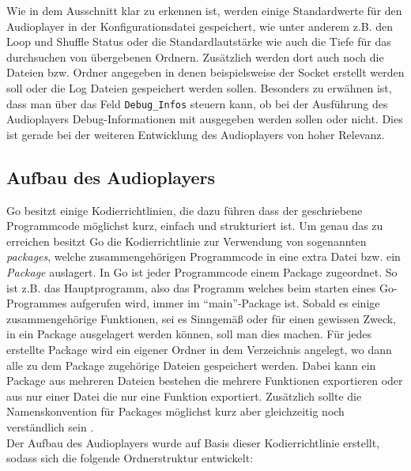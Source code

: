 Wie in dem Ausschnitt klar zu erkennen ist, werden einige Standardwerte für den
Audioplayer in der Konfigurationsdatei gespeichert, wie unter anderem z.B. den
Loop und Shuffle Status oder die Standardlautstärke wie auch die Tiefe für das
durchsuchen von übergebenen Ordnern. Zusätzlich werden dort auch noch die
Dateien bzw. Ordner angegeben in denen beispielsweise der Socket erstellt
werden soll oder die Log Dateien gespeichert werden sollen. Besonders zu
erwähnen ist, dass man über das Feld \verb|Debug_Infos| steuern kann, ob bei
der Ausführung des Audioplayers Debug-Informationen mit ausgegeben werden
sollen oder nicht. Dies ist gerade bei der weiteren Entwicklung des
Audioplayers von hoher Relevanz.

\subsection{Aufbau des Audioplayers}
Go besitzt einige Kodierrichtlinien, die dazu führen dass der geschriebene
Programmcode möglichst kurz, einfach und strukturiert ist. Um genau das zu
erreichen besitzt Go die Kodierrichtlinie zur Verwendung von sogenannten
\textit{packages}, welche zusammengehörigen Programmcode in eine extra Datei
bzw. ein \textit{Package} auslagert. In Go ist jeder Programmcode einem Package
zugeordnet. So ist z.B. das Hauptprogramm, also das Programm welches beim
starten eines Go-Programmes aufgerufen wird, immer im \enquote{main}-Package
ist. Sobald es einige zusammengehörige Funktionen, sei es Sinngemäß oder für
einen gewissen Zweck, in ein Package ausgelagert werden können, soll man dies
machen. Für jedes erstellte Package wird ein eigener Ordner in dem Verzeichnis
angelegt, wo dann alle zu dem Package zugehörige Dateien gespeichert werden.
Dabei kann ein Package aus mehreren Dateien bestehen die mehrere Funktionen
exportieren oder aus nur einer Datei die nur eine Funktion exportiert.
Zusätzlich sollte die Namenskonvention für Packages möglichst kurz aber
gleichzeitig noch verständlich sein \autocite{crawshaw_2019}. \\
Der Aufbau des Audioplayers wurde auf Basis dieser Kodierrichtlinie erstellt,
sodass sich die folgende Ordnerstruktur entwickelt:


